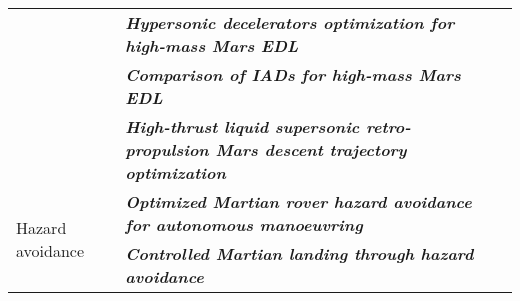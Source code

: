 \begin{longtable}{|l|p{8cm}|p{3cm}|}
 		& \textbf{\textit{Hypersonic decelerators optimization for high-mass Mars EDL}} & \Cref{ch:oversub,sec:mslref,ch:optimization,ch:int,ch:reftrans,ch:entry}\\ \cline{2-3}
 		& \textbf{\textit{Comparison of IADs for high-mass Mars EDL}} & \Cref{ch:oversub,sec:mslref,ch:optimization,ch:int,ch:reftrans,ch:entry} \\ \cline{2-3}
 		&  \textbf{\textit{High-thrust liquid supersonic retro-propulsion Mars descent trajectory optimization}} & \Cref{ch:oversub,sec:mslref,ch:optimization,ch:int,ch:reftrans,ch:entry} \\ \hline
\multirow{2}{*}{Hazard avoidance} 		& \textbf{\textit{Optimized Martian rover hazard avoidance for autonomous manoeuvring}} & \Cref{ch:oversub,sec:rharef,ch:optimization,ch:int,ch:reftrans} \\ \cline{2-3} 
 		& \textbf{\textit{Controlled Martian landing through hazard avoidance}} & \Cref{ch:oversub,sec:rharef,ch:optimization,ch:int,ch:reftrans,ch:entry} \\ \hline
			
\end{longtable}

